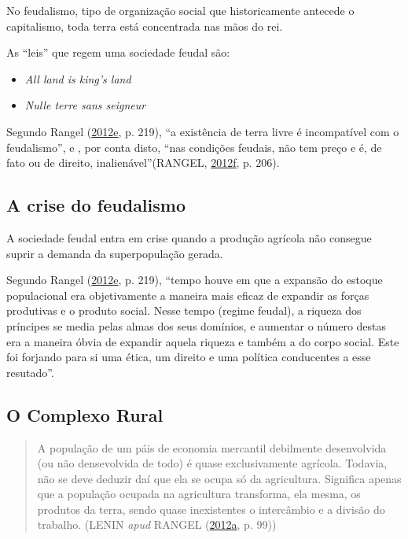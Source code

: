 \documentclass[a4paper, 12pt]{article}
\providecommand{\tightlist}{%
  \setlength{\itemsep}{0pt}\setlength{\parskip}{0pt}}
\begin{document}
No feudalismo, tipo de organização social que historicamente antecede o
capitalismo, toda terra está concentrada nas mãos do rei.

As ``leis'' que regem uma sociedade feudal são:

\begin{itemize}
\tightlist
\item
  \emph{All land is king's land}
\item
  \emph{Nulle terre sans seigneur}
\end{itemize}

Segundo Rangel
(\protect\hyperlink{ref-rangel1961}{2012}\protect\hyperlink{ref-rangel1961}{e},
p. 219), ``a existência de terra livre é incompatível com o
feudalismo'', e , por conta disto, ``nas condições feudais, não tem
preço e é, de fato ou de direito, inalienável''(RANGEL,
\protect\hyperlink{ref-rangel1960}{2012}\protect\hyperlink{ref-rangel1960}{f},
p. 206).

\hypertarget{a-crise-do-feudalismo}{%
\subsection{A crise do feudalismo}\label{a-crise-do-feudalismo}}

A sociedade feudal entra em crise quando a produção agrícola não
consegue suprir a demanda da superpopulação gerada.

Segundo Rangel
(\protect\hyperlink{ref-rangel1961}{2012}\protect\hyperlink{ref-rangel1961}{e},
p. 219), ``tempo houve em que a expansão do estoque populacional era
objetivamente a maneira mais eficaz de expandir as forças produtivas e o
produto social. Nesse tempo (regime feudal), a riqueza dos príncipes se
media pelas almas dos seus domínios, e aumentar o número destas era a
maneira óbvia de expandir aquela riqueza e também a do corpo social.
Este foi forjando para si uma ética, um direito e uma política
conducentes a esse resutado''.

\hypertarget{o-complexo-rural}{%
\subsection{O Complexo Rural}\label{o-complexo-rural}}

\begin{quote}
A população de um páis de economia mercantil debilmente desenvolvida (ou
não densevolvida de todo) é quase exclusivamente agrícola. Todavia, não
se deve deduzir daí que ela se ocupa só da agricultura. Significa apenas
que a população ocupada na agricultura transforma, ela mesma, os
produtos da terra, sendo quase inexistentes o intercâmbio e a divisão do
trabalho. (LENIN \emph{apud} RANGEL
(\protect\hyperlink{ref-rangel1954}{2012}\protect\hyperlink{ref-rangel1954}{a},
p. 99))
\end{quote}
\end{document}
